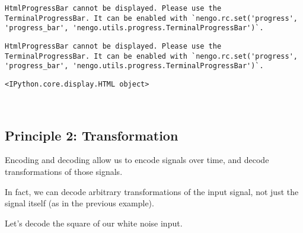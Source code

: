 \documentclass[11pt]{article}
\newcommand{\prompt}[4]{
        \llap{{\color{#2}[#3]: #4}}\vspace{-1.25em}
    }
\begin{document}
    
    \begin{verbatim}
HtmlProgressBar cannot be displayed. Please use the TerminalProgressBar. It can be enabled with `nengo.rc.set('progress', 'progress_bar', 'nengo.utils.progress.TerminalProgressBar')`.
    \end{verbatim}

    
    
    
    
    \begin{verbatim}
HtmlProgressBar cannot be displayed. Please use the TerminalProgressBar. It can be enabled with `nengo.rc.set('progress', 'progress_bar', 'nengo.utils.progress.TerminalProgressBar')`.
    \end{verbatim}

    
    
    
            \begin{tcolorbox}[breakable, boxrule=.5pt, size=fbox, pad at break*=1mm, opacityfill=0]
\prompt{Out}{outcolor}{15}{\hspace{3.5pt}}
\begin{Verbatim}[commandchars=\\\{\}]
<IPython.core.display.HTML object>
\end{Verbatim}
\end{tcolorbox}
        
    \begin{center}
    \end{center}
    { \hspace*{\fill} \\}
    
    \hypertarget{principle-2-transformation}{%
\subsection{Principle 2:
Transformation}\label{principle-2-transformation}}

Encoding and decoding allow us to encode signals over time, and decode
transformations of those signals.

In fact, we can decode arbitrary transformations of the input signal,
not just the signal itself (as in the previous example).

Let's decode the square of our white noise input.
\end{document}
